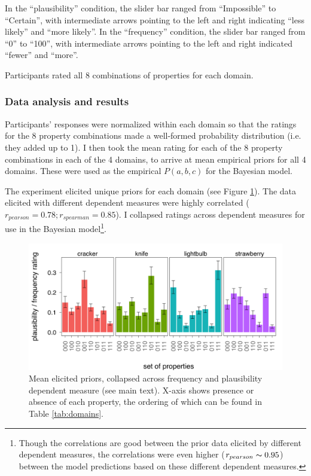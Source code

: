 \documentclass{article} %
\begin{document}
In the ``plausibility'' condition, the slider bar ranged from ``Impossible'' to ``Certain'', with intermediate arrows pointing to the left and right indicating ``less likely'' and ``more likely''. In the ``frequency'' condition, the slider bar ranged from ``0'' to ``100'', with intermediate arrows pointing to the left and right indicated ``fewer'' and ``more''. 

Participants rated all 8 combinations of properties for each domain.

\subsubsection{Data analysis and results}

Participants' responses were normalized within each domain so that the ratings for the 8 property combinations made a well-formed probability distribution (i.e. they added up to 1). I then took the mean rating for each of the 8 property combinations in each of the 4 domains, to arrive at mean empirical priors for all 4 domains. These were used as the empirical $P(a,b,c)$ for the Bayesian model. 

The experiment elicited unique priors for each domain (see Figure \ref{fig:priors}). The data elicited with different dependent measures were highly correlated ($r_{pearson} = 0.78; r_{spearman} = 0.85$). I collapsed ratings across dependent measures for use in the Bayesian model\footnote{Though the correlations are good between the prior data elicited by different dependent measures, the correlations were even higher ($r_{pearson} \thicksim 0.95$) between the model predictions based on these different dependent measures.}.

\begin{figure}
\centering
    \includegraphics[width=\columnwidth]{priors}
    \caption{Mean elicited priors, collapsed across frequency and plausibility dependent measure (see main text). X-axis shows presence or absence of each property, the ordering of which can be found in Table \ref{tab:domains}.}
  \label{fig:priors}
\end{figure}
\end{document}
